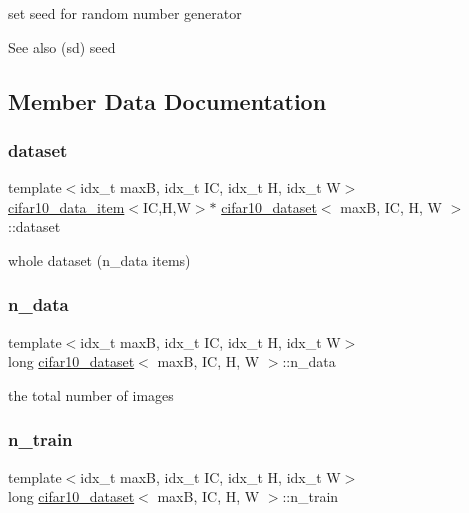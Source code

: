 set seed for random number generator 

\begin{DoxySeeAlso}{See also}
(sd) seed 
\end{DoxySeeAlso}


\subsection{Member Data Documentation}
\mbox{\label{structcifar10__dataset_a8c4071c746bf18e875b9e7975c7929fd}} 
\subsubsection{\texorpdfstring{dataset}{dataset}}
{\footnotesize\ttfamily template$<$idx\+\_\+t maxB, idx\+\_\+t IC, idx\+\_\+t H, idx\+\_\+t W$>$ \\
\hyperlink{structcifar10__data__item}{cifar10\+\_\+data\+\_\+item}$<$IC,H,W$>$$\ast$ \hyperlink{structcifar10__dataset}{cifar10\+\_\+dataset}$<$ maxB, IC, H, W $>$\+::dataset}

whole dataset (n\+\_\+data items) \mbox{\label{structcifar10__dataset_a60c9f64838a155a1127912cf190b3ed0}} 
\subsubsection{\texorpdfstring{n\+\_\+data}{n\_data}}
{\footnotesize\ttfamily template$<$idx\+\_\+t maxB, idx\+\_\+t IC, idx\+\_\+t H, idx\+\_\+t W$>$ \\
long \hyperlink{structcifar10__dataset}{cifar10\+\_\+dataset}$<$ maxB, IC, H, W $>$\+::n\+\_\+data}

the total number of images \mbox{\label{structcifar10__dataset_ac6e5dbe7c30b683d01e600901c51e010}} 
\subsubsection{\texorpdfstring{n\+\_\+train}{n\_train}}
{\footnotesize\ttfamily template$<$idx\+\_\+t maxB, idx\+\_\+t IC, idx\+\_\+t H, idx\+\_\+t W$>$ \\
long \hyperlink{structcifar10__dataset}{cifar10\+\_\+dataset}$<$ maxB, IC, H, W $>$\+::n\+\_\+train}

